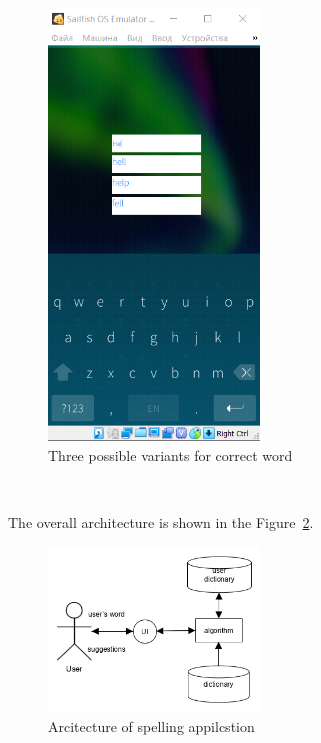 \documentclass[conference]{IEEEtran}
\begin{document}
\begin{figure}[!hbt]
	\centering
	\includegraphics[width=0.5\textwidth]{images/3.png}
	\caption{
		 Three possible variants for correct word}
	\label{three}
\end{figure}
\

The overall architecture is shown in the Figure~\ref{arh}.
\begin{figure}[!hbt]
	\centering
	\includegraphics[width=0.5\textwidth]{images/pic.png}
	\caption{
		Arcitecture of spelling appilcstion}
	\label{arh}
\end{figure}


\begin{enumerate} 
	

\end{enumerate}
\end{document}
